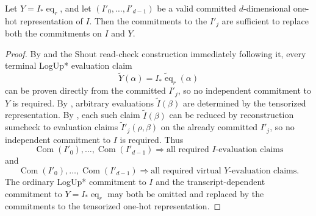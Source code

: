 \begin{theorem}\label{thm:virtualize}
Let $Y = I_*\operatorname{eq}_r$, and let $(I'_0,\ldots,I'_{d-1})$ be a valid committed $d$-dimensional
one-hot representation of $I$. Then the commitments to the $I'_j$ are sufficient to replace both the 
commitments on $I$ and $Y$.
\end{theorem}

\begin{proof}
By  and the Shout read-check construction immediately following it, every terminal LogUp* evaluation claim
\[
\widetilde{Y}(\alpha)
=
\widetilde{I_*\operatorname{eq}_r}(\alpha)
\]
can be proven directly from the committed $I'_j$, so no independent commitment to $Y$ is required.
By , arbitrary evaluations $\widetilde{I}(\beta)$ are determined by the tensorized representation.
By , each such claim $\widetilde{I}(\beta)$ can be reduced by reconstruction sumcheck to evaluation claims
$\widetilde{I}'_j(\rho,\beta)$
on the already committed $I'_j$, so no independent commitment to $I$ is required.
Thus
\[
\operatorname{Com}(I'_0),\ldots,\operatorname{Com}(I'_{d-1})
\Rightarrow
\text{all required $I$-evaluation claims}
\]
and
\[
\operatorname{Com}(I'_0),\ldots,\operatorname{Com}(I'_{d-1})
\Rightarrow
\text{all required virtual $Y$-evaluation claims}.
\]
The ordinary LogUp* commitment to $I$ and the transcript-dependent commitment to $Y=I_*\operatorname{eq}_r$ may both be omitted and replaced by the commitments to the tensorized one-hot representation.
\end{proof}


